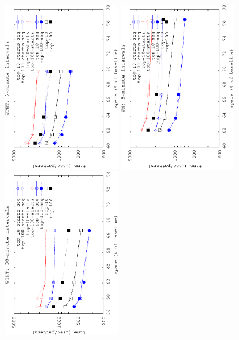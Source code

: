 	\begin{figure}[!ht]
		\begin{center}

			{\includegraphics[angle=-90,width=0.45\textwidth]{figures_synt/madrid_st_topk_ht_5.eps}}
			{\includegraphics[angle=-90,width=0.45\textwidth]{figures_synt/madrid_st_topk_wm_5.eps}}
			{\includegraphics[angle=-90,width=0.45\textwidth]{figures_synt/madrid_st_topk_ht_30.eps}}

\end{center}
\end{figure}

